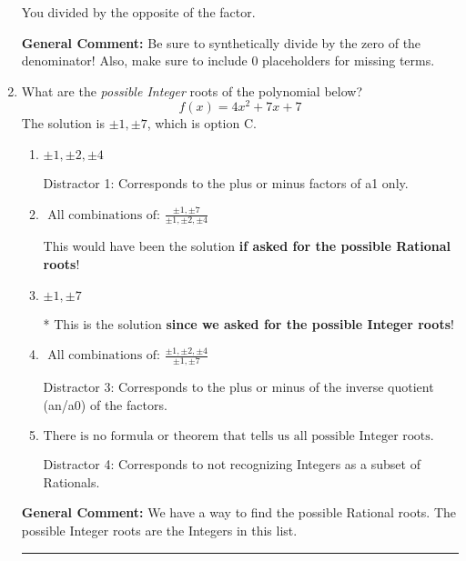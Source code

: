 \documentclass{extbook}[14pt]
\newcommand{\litem}[1]{\item #1

\rule{\textwidth}{0.4pt}}
\begin{document}
\begin{enumerate}
{\begin{enumerate}[label=\Alph*.]
 You divided by the opposite of the factor.
\end{enumerate}

\textbf{General Comment:} Be sure to synthetically divide by the zero of the denominator! Also, make sure to include 0 placeholders for missing terms.
}
\litem{
What are the \textit{possible Integer} roots of the polynomial below?
\[ f(x) = 4x^{2} +7 x + 7 \]The solution is \( \pm 1,\pm 7 \), which is option C.\begin{enumerate}[label=\Alph*.]
\item \( \pm 1,\pm 2,\pm 4 \)

 Distractor 1: Corresponds to the plus or minus factors of a1 only.
\item \( \text{ All combinations of: }\frac{\pm 1,\pm 7}{\pm 1,\pm 2,\pm 4} \)

This would have been the solution \textbf{if asked for the possible Rational roots}!
\item \( \pm 1,\pm 7 \)

* This is the solution \textbf{since we asked for the possible Integer roots}!
\item \( \text{ All combinations of: }\frac{\pm 1,\pm 2,\pm 4}{\pm 1,\pm 7} \)

 Distractor 3: Corresponds to the plus or minus of the inverse quotient (an/a0) of the factors. 
\item \( \text{There is no formula or theorem that tells us all possible Integer roots.} \)

 Distractor 4: Corresponds to not recognizing Integers as a subset of Rationals.
\end{enumerate}

\textbf{General Comment:} We have a way to find the possible Rational roots. The possible Integer roots are the Integers in this list.
}
\end{enumerate}
\end{document}
